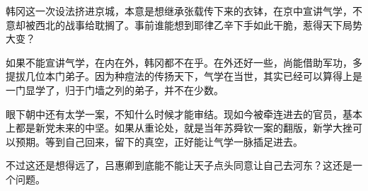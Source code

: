韩冈这一次设法挤进京城，本意是想继承张载传下来的衣钵，在京中宣讲气学，不意却被西北的战事给耽搁了。事前谁能想到耶律乙辛下手如此干脆，惹得天下局势大变？

如果不能宣讲气学，在内在外，韩冈都不在乎。在外还好一些，尚能借助军功，多提拔几位本门弟子。因为种痘法的传扬天下，气学在当世，其实已经可以算得上是一门显学了，归于门墙之列的弟子，并不在少数。

眼下朝中还有太学一案，不知什么时候才能审结。现如今被牵连进去的官员，基本上都是新党未来的中坚。如果从重论处，就是当年苏舜钦一案的翻版，新学大挫可以预期。等到自己回来，留下的真空，正好能让气学一脉插足进去。

不过这还是想得远了，吕惠卿到底能不能让天子点头同意让自己去河东？这还是一个问题。

